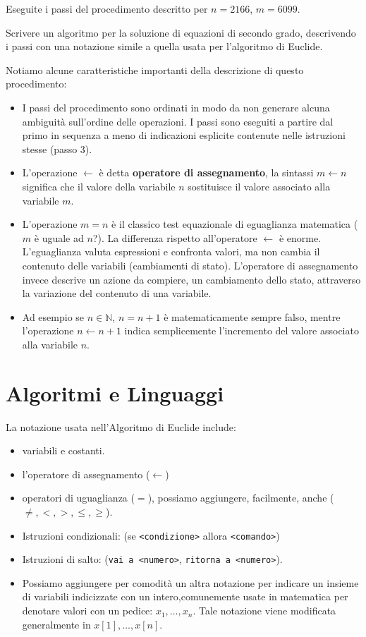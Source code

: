 \begin{ex}
Eseguite i passi del procedimento descritto per $n=2166$,
$m=6099$.\end{ex}

\begin{ex} Scrivere un algoritmo per la soluzione di equazioni di
secondo grado, descrivendo i passi con una notazione simile a quella
usata per l'algoritmo di Euclide.\end{ex}


Notiamo alcune caratteristiche importanti della descrizione di questo procedimento:
\begin{itemize}
\item I passi del procedimento sono ordinati in modo da non generare
  alcuna ambiguità sull'ordine delle operazioni. I passi sono eseguiti
  a partire dal primo in sequenza a meno di indicazioni esplicite
  contenute nelle istruzioni stesse (passo 3).
\item L'operazione $\leftarrow$ è detta \textbf{operatore di
    assegnamento}, la sintassi $m \leftarrow n$ significa che il
  valore della variabile $n$ sostituisce il valore associato alla
  variabile $m$.
\item L'operazione $m = n$ è il classico test equazionale di
  eguaglianza matematica ($m$ è uguale ad $n$?). La differenza
  rispetto all'operatore $\leftarrow$ è enorme. L'eguaglianza valuta
  espressioni e confronta valori, ma non cambia il contenuto delle
  variabili (cambiamenti di stato). L'operatore di assegnamento invece
  descrive un azione da compiere, un cambiamento dello stato,
  attraverso la variazione del contenuto di una variabile.
\item Ad esempio se $n \in \mathbb{N}$, $n = n + 1$ è matematicamente
  sempre falso, mentre l'operazione $n \leftarrow n + 1$ indica
  semplicemente l'incremento del valore associato alla variabile $n$.
\end{itemize}

\section{Algoritmi e Linguaggi}

La notazione usata nell'Algoritmo di Euclide include:
\begin{itemize}
 \item variabili e costanti.
 \item l'operatore di assegnamento ($\leftarrow$)
 \item operatori di uguaglianza ($=$), possiamo aggiungere,
   facilmente, anche ($\neq, <, >, \leq, \geq$).
 \item Istruzioni condizionali: (se \verb|<condizione>| allora
   \verb|<comando>|)
 \item Istruzioni di salto: (\verb|vai a <numero>|,
   \verb|ritorna a <numero>|).
 \item Possiamo aggiungere per comodità un altra notazione per
   indicare un insieme di variabili indicizzate con un
   intero,comunemente usate in matematica per denotare valori con un
   pedice: $x_1,\ldots,x_n$. Tale notazione viene modificata
   generalmente in $x[1],\ldots,x[n]$.
\end{itemize}

